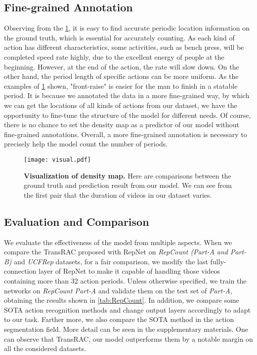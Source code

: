 \documentclass[10pt,twocolumn,letterpaper]{article}
\begin{document}
\subsection{Fine-grained Annotation}
Observing from the \cref{fig:visual}, it is easy to find accurate periodic location information on the ground truth, which is essential for accurately counting. As each kind of action has different characteristics, some activities, such as bench press, will be completed speed rate highly, due to the excellent energy of people at the beginning. However, at the end of the action, the rate will slow down. On the other hand, the period length of specific actions can be more uniform. As the examples of \cref{fig:visual} shown, "front-raise" is easier for the man to finish in a statable period. It is because we annotated the data in a more fine-grained way, by which we can get the locations of all kinds of actions from our dataset, we have the opportunity to fine-tune the structure of the model for different needs. Of course, there is no chance to set the density map as a predictor of our model without fine-grained annotations. Overall, a more fine-grained annotation is necessary to precisely help the model count the number of periods.  

\begin{figure}[ht]
\centering

\centerline{\texttt{[image: visual.pdf]}}\caption{
\textbf{Visualization of density map.}
Here are comparisons between the ground truth and prediction result from our model. We can see from the first pair that the duration of videos in our dataset varies.  }
\label{fig:visual}
\end{figure}


\subsection{Evaluation and Comparison}
We evaluate the effectiveness of the model from multiple aspects. When we compare the TransRAC proposed with RepNet on \emph{RepCount (Part-A and Part-B)} and \emph{UCFRep} datasets, for a fair comparison, we modify the last fully-connection layer of RepNet\cite{RepNet} to make it capable of handling those videos containing more than 32 action periods. Unless otherwise specified, we train the networks on \emph{RepCount Part-A} and validate them on the test set of \emph{Part-A}, obtaining the results shown in \cref{tab:RepCount}. In addition, we compare some SOTA action recognition methods \cite{X3D,TANet,video-swin-transformer} and change output layers accordingly to adapt to our task. 
Farther more, we also compare the SOTA method \cite{huang2020improving} in the action segmentation field. More detail can be seen in the supplementary materials. One can observe that TransRAC, our model outperforms them by a notable margin on all the considered datasets.
\end{document}
